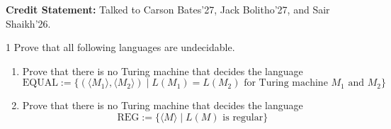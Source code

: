 \documentclass[12pt]{article}
\begin{document}


\textbf{Credit Statement:} Talked to Carson Bates'27, Jack Bolitho'27, and Sair Shaikh'26. 

\begin{problem}{1}
Prove that all following languages are undecidable.

\begin{enumerate}
    \item Prove that there is no Turing machine that decides the language
    \[\text{EQUAL} := \{ \left( \langle M_1 \rangle, \langle M_2 \rangle \right) \mid  L(M_1) = L(M_2) \text{ for Turing machine $M_1$ and $M_2$}\}\]
    \item Prove that there is no Turing machine that decides the language
    \[\text{REG} := \{  \langle M \rangle \mid  L(M) \text{ is regular}\}\]
\end{enumerate}
\end{problem}
\end{document}
